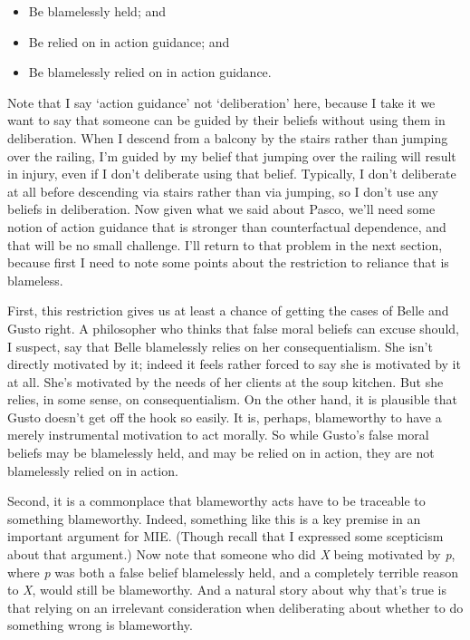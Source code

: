 \begin{itemize}
\item{} Be blamelessly held; and

\item{} Be relied on in action guidance; and

\item{} Be blamelessly relied on in action guidance.

\end{itemize}
Note that I say `action guidance' not `deliberation' here, because I take it we want to say that someone can be guided by their beliefs without using them in deliberation. When I descend from a balcony by the stairs rather than jumping over the railing, I'm guided by my belief that jumping over the railing will result in injury, even if I don't deliberate using that belief. Typically, I don't deliberate at all before descending via stairs rather than via jumping, so I don't use any beliefs in deliberation. Now given what we said about \gls{Pasco}, we'll need some notion of action guidance that is stronger than counterfactual dependence, and that will be no small challenge. I'll return to that problem in the next section, because first I need to note some points about the restriction to reliance that is blameless.

First, this restriction gives us at least a chance of getting the cases of \gls{Belle} and \gls{Gusto} right. A philosopher who thinks that false moral beliefs can excuse should, I suspect, say that \gls{Belle} blamelessly relies on her consequentialism. She isn't directly motivated by it; indeed it feels rather forced to say she is motivated by it at all. She's motivated by the needs of her clients at the soup kitchen. But she relies, in some sense, on consequentialism. On the other hand, it is plausible that \gls{Gusto} doesn't get off the hook so easily. It is, perhaps, blameworthy to have a merely instrumental motivation to act morally. So while \gls{Gusto}'s false moral beliefs may be blamelessly held, and may be relied on in action, they are not blamelessly relied on in action.

Second, it is a commonplace that blameworthy acts have to be traceable to something blameworthy. Indeed, something like this is a key premise in an important argument for MIE. (Though recall that I expressed some scepticism about that argument.) Now note that someone who did \emph{X} being motivated by \emph{p}, where \emph{p} was both a false belief blamelessly held, and a completely terrible reason to \emph{X}, would still be blameworthy. And a natural story about why that's true is that relying on an irrelevant consideration when deliberating about whether to do something wrong is blameworthy.

